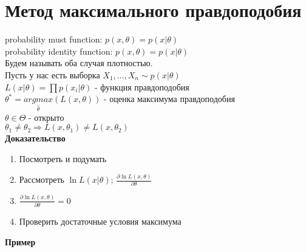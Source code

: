 \documentclass{article}
\newcommand\0{\mathbb{0}}
\newcommand\1{\mathbb{1}}
\begin{document}
\section{Метод максимального правдоподобия}
probability must function: $p(x, \theta) = p(x|\theta)$\\
probability identity function: $p(x, \theta) = p(x|\theta)$\\
Будем называть оба случая плотностью.\\
Пусть у нас есть выборка $X_1, \dots, X_n \sim p(x|\theta)$\\
$L(x|\theta) = \displaystyle\prod p(x_i|\theta)$ - функция правдоподобия\\
$\theta^* = \underset{\widehat{\theta}}{argmax}(L(x, \theta))$ - оценка максимума правдоподобия\\
$\theta \in \Theta$ - открыто\\
$\theta_1 \neq \theta_2 \Rightarrow L(x,\theta_1) \neq L(x, \theta_2)$\\
\textbf{Доказательство}
\begin{enumerate}
    \item Посмотреть и подумать
    \item Рассмотреть $\ln{L(x|\theta)}$; $\frac{\partial \ln{L(x, \theta)}}{\partial \theta}$
    \item $\frac{\partial \ln{L(x, \theta)}}{\partial \theta} = 0$
    \item Проверить достаточные условия максимума
\end{enumerate}
\textbf{Пример}
\end{document}
